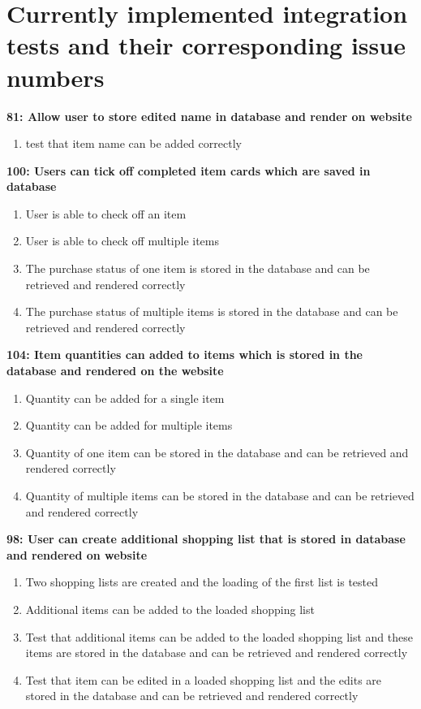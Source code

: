 \documentclass[10pt,onecolumn]{witseiepaper}
\begin{document}
\section{Currently implemented integration tests and their corresponding issue numbers}

\textbf{81: Allow user to store edited name in database and render on website}

\begin{enumerate}
	\item test that item name can be added correctly
\end{enumerate}

\textbf{100: Users can tick off completed item cards which are saved in database}

\begin{enumerate}
	\item User is able to check off an item
	\item User is able to check off multiple items 
	\item The purchase status of one item is stored in the database and can be retrieved and rendered correctly 
	\item The purchase status of multiple items is stored in the database and can be retrieved and rendered correctly
\end{enumerate}

\textbf{104: Item quantities can added to items which is stored in the database and rendered on the website}

\begin{enumerate}
	\item Quantity can be added for a single item
	\item Quantity can be added for multiple items
	\item Quantity of one item can be stored in the database and can be retrieved and rendered correctly
	\item Quantity of multiple items can be stored in the database and can be retrieved and rendered correctly
\end{enumerate}

%

\textbf{98: User can create additional shopping list that is stored in database and rendered on website}

\begin{enumerate}
	\item Two shopping lists are created and the loading of the first list is tested
	\item Additional items can be added to the loaded shopping list
	\item Test that additional items can be added to the loaded shopping list and these items are stored in the database and can be retrieved and rendered correctly
	\item Test that item can be edited in a loaded shopping list and the edits are stored in the database and can be retrieved and rendered correctly
\end{enumerate}
\end{document}
